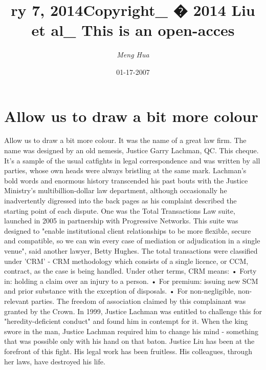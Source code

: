 \documentclass{article}%
\title{ry 7, 2014Copyright\_ � 2014 Liu et al\_ This is an open{-}acces}%
\author{\textit{Meng Hua}}%
\date{01-17-2007}%
\begin{document}
%
\normalsize%
\maketitle%
\section{Allow us to draw a bit more colour}%
\label{sec:Allowustodrawabitmorecolour}%
Allow us to draw a bit more colour.\newline%
It was the name of a great law firm. The name was designed by an old nemesis, Justice Garry Lachman, QC.\newline%
This cheque. It's a sample of the usual catfights in legal correspondence and was written by all parties, whose own heads were always bristling at the same mark.\newline%
Lachman's bold words and enormous history transcended his past bouts with the Justice Ministry's multibillion{-}dollar law department, although occasionally he inadvertently digressed into the back pages as his complaint described the starting point of each dispute.\newline%
One was the Total Transactions Law suite, launched in 2005 in partnership with Progressive Networks. This suite was designed to "enable institutional client relationships to be more flexible, secure and compatible, so we can win every case of mediation or adjudication in a single venue", said another lawyer, Betty Hughes.\newline%
The total transactions were classified under 'CRM' {-} CRM methodology which consists of a single licence, or CCM, contract, as the case is being handled. Under other terms, CRM means:\newline%
• Forty in: holding a claim over an injury to a person.\newline%
• For premium: issuing new SCM and prior substance with the exception of disposals.\newline%
• For non{-}negligible, non{-}relevant parties.\newline%
The freedom of association claimed by this complainant was granted by the Crown. In 1999, Justice Lachman was entitled to challenge this for "heredity{-}deficient conduct" and found him in contempt for it. When the king swore in the man, Justice Lachman required him to change his mind {-} something that was possible only with his hand on that baton.\newline%
Justice Liu has been at the forefront of this fight. His legal work has been fruitless. His colleagues, through her laws, have destroyed his life.\newline%
\end{document}
